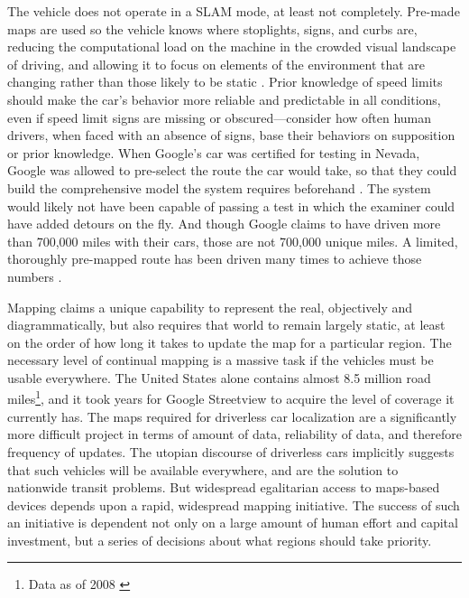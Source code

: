 The vehicle does not operate in a SLAM mode, at least not completely.
Pre-made maps are used so the vehicle knows where stoplights, signs,
and curbs are, reducing the computational load on the machine in the
crowded visual landscape of driving, and allowing it to focus on
elements of the environment that are changing rather than those likely
to be static \cite{gomesObstacles}. Prior knowledge of speed limits should make the car's
behavior more reliable and predictable in all conditions, even if
speed limit signs are missing or obscured---consider how often human
drivers, when faced with an absence of signs, base their behaviors on
supposition or prior knowledge. When Google's car was certified for
testing in Nevada, Google was allowed to pre-select the route the car
would take, so that they could build the comprehensive model the
system requires beforehand \cite{harrisNevada}. The system would likely not have been
capable of passing a test in which the examiner could have added
detours on the fly. And though Google claims to have driven more than
700,000 miles with their cars, those are not 700,000 unique miles. A
limited, thoroughly pre-mapped route has been driven many times to
achieve those numbers \cite{gomesCircles}.


Mapping claims a unique capability to
represent the real, objectively
and diagrammatically, but also requires that world to remain largely
static, at least on the order of how long it takes to update the map
for a particular region. The necessary level of continual mapping is a massive task if the
vehicles must be usable everywhere. The United States alone contains almost
8.5 million road miles\footnote{Data as of 2008 \cite{carneyMiles}},
and it took years for Google Streetview to acquire the level of
coverage it currently has. The maps required for driverless car
localization are a significantly more difficult project in terms of
amount of data, reliability of data, and therefore frequency of
updates. The utopian discourse of driverless cars
implicitly suggests that such vehicles will be available everywhere,
and are the solution to nationwide transit problems. But widespread
egalitarian access to maps-based devices depends upon a rapid,
widespread mapping initiative. The success of such an initiative is
dependent not only on a large amount of human effort and capital
investment, but a series of decisions about what regions should take priority.

